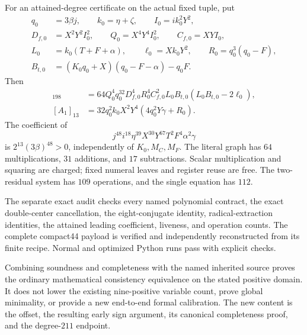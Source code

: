 For an attained-degree certificate on the actual fixed tuple, put
\begin{align*}
 q_0&=3\beta j,\qquad k_0=\eta+\zeta,\qquad I_0=ik_0^2Y^2,\\
 D_{f,0}&=X^2Y^2I_0^2,\qquad Q_0=X^4Y^4I_0^2,\qquad C_{f,0}=XYI_0,\\
 L_0&=k_0(T+F+\alpha),\qquad\ell_0=Xk_0Y^2,\qquad R_0=q_0^3(q_0-F),\\
 B_{t,0}&=(K_0q_0+X)(q_0-F-\alpha)-q_0F.
\end{align*}
Then
\begin{align*}
 [N_8]_{198}&=64Q_0^4q_0^{32}D_{f,0}^4R_0^4C_{f,0}^2
                 L_0B_{t,0}(L_0B_{t,0}-2\ell_0),\\
 [A_1]_{13}&=32q_0^2k_0X^2Y^4(4q_0^2Y\gamma+R_0).
\end{align*}
The coefficient of
\[
 j^{48}i^{18}\eta^{39}X^{30}Y^{67}T^2F^4\alpha^2\gamma
\]
is $2^{13}(3\beta)^{48}>0$, independently of $K_0,M_C,M_F$.
The literal graph has $64$ multiplications, $31$ additions, and $17$
subtractions. Scalar multiplication and squaring are charged; fixed
numeral leaves and register reuse are free. The two-residual system has
$109$ operations, and the single equation has $112$.

The separate exact audit checks every named polynomial contract, the exact
double-center cancellation, the eight-conjugate identity, radical-extraction
identities, the attained leading coefficient, liveness, and operation
counts. The complete compact44 payload is verified and independently
reconstructed from its finite recipe. Normal and optimized Python runs
pass with explicit checks.

Combining soundness and completeness with the named inherited source
proves the ordinary mathematical consistency equivalence on the stated
positive domain. It does not lower the existing nine-positive variable
count, prove global minimality, or provide a new end-to-end formal
calibration. The new content is the offset, the resulting early sign
argument, its canonical completeness proof, and the degree-$211$ endpoint.


